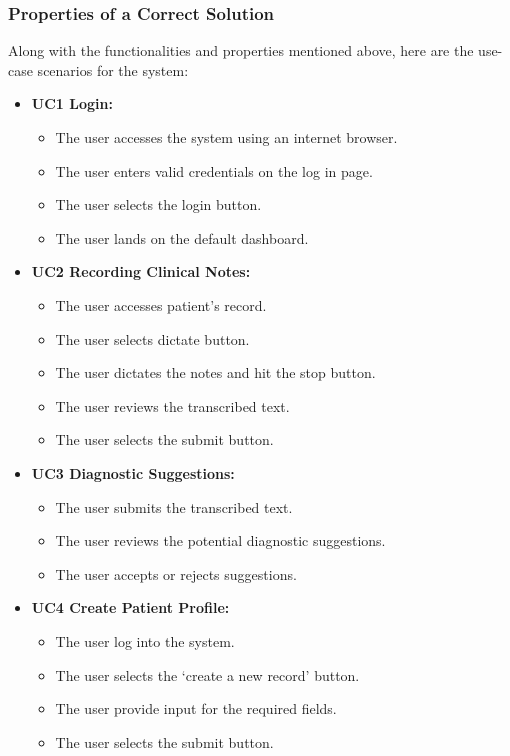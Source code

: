 \documentclass[12pt]{article}
\begin{document}
\subsubsection{Properties of a Correct Solution} \label{sec_CorrectSolution}

Along with the functionalities and properties mentioned above, here are the use-case scenarios for the system:

\begin{itemize}
  \item\textbf{UC1 Login:}
  \begin{itemize}
    \item The user accesses the system using an internet browser.
    \item The user enters valid credentials on the log in page.
    \item The user selects the login button.
    \item The user lands on the default dashboard.
  \end{itemize}
  \item\textbf{UC2 Recording Clinical Notes:}
  \begin{itemize}
    \item The user accesses patient’s record.
    \item The user selects dictate button.
    \item The user dictates the notes and hit the stop button.
    \item The user reviews the transcribed text.
    \item The user selects the submit button.
  \end{itemize}
  \item\textbf{UC3 Diagnostic Suggestions:}
  \begin{itemize}
    \item The user submits the transcribed text.
    \item The user reviews the potential diagnostic suggestions.
    \item The user accepts or rejects suggestions.
  \end{itemize}
  \item\textbf{UC4 Create Patient Profile:}
  \begin{itemize}
    \item The user log into the system.
    \item The user selects the ‘create a new record’ button.
    \item The user provide input for the required fields.    
    \item The user selects the submit button.
  \end{itemize}
\end{itemize}
\end{document}
